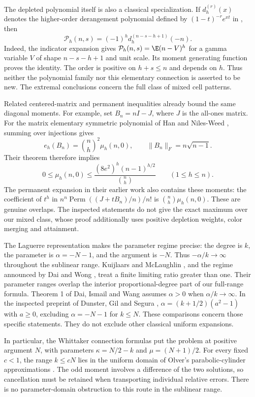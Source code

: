 The depleted polynomial itself is also a classical specialization. If $d_h^{(r)}(x)$ denotes the higher-order derangement polynomial defined by $(1-t)^{-r}e^{xt}$ in \cite[equation (2.22)]{KKJK}, then
\[
\mathcal P_h(n,s)=(-1)^h d_h^{(n-s-h+1)}(-n).
\]
Indeed, the indicator expansion gives $\mathcal P_h(n,s)=\E(n-V)^h$ for a gamma variable $V$ of shape $n-s-h+1$ and unit scale. Its moment generating function proves the identity. The order is positive on $h+s\le n$ and depends on $h$. Thus neither the polynomial family nor this elementary connection is asserted to be new. The extremal conclusions concern the full class of mixed cell patterns.

Related centered-matrix and permanent inequalities already bound the same diagonal moments. For example, set $B_n=nI-J$, where $J$ is the all-ones matrix. For the matrix elementary symmetric polynomial of Han and Niles-Weed \cite[equation (2), Theorem 1.2]{HNcentered}, summing over injections gives
\[
e_h(B_n)=\binom nh^2\mu_h(n,0),\qquad
\|B_n\|_F=n\sqrt{n-1}.
\]
Their theorem therefore implies
\[
0\le\mu_h(n,0)\le
\frac{(8e^2)^h(n-1)^{h/2}}{\binom nh}\qquad(1\le h\le n).
\]
The permanent expansion in their earlier work \cite[equation (29), Lemma 5.5 in the inspected preprint]{HNmixtures} also contains these moments: the coefficient of $t^h$ in
$n^n\operatorname{Perm}((J+tB_n)/n)/n!$ is $\binom nh\mu_h(n,0)$.
These are genuine overlaps. The inspected statements do not give the exact maximum over our mixed class, whose proof additionally uses positive depletion weights, color merging and attainment.

The Laguerre representation makes the parameter regime precise: the degree is $k$, the parameter is $\alpha=-N-1$, and the argument is $-N$. Thus $-\alpha/k\to\infty$ throughout the sublinear range. Kuijlaars and McLaughlin \cite[Theorem 7.1 and Remark 5.4]{KM}, and the regime announced by Dai and Wong \cite{DW}, treat a finite limiting ratio greater than one. Their parameter ranges overlap the interior proportional-degree part of our full-range formula. Theorem 1 of Dai, Ismail and Wang \cite{DIW} assumes $\alpha>0$ when $\alpha/k\to\infty$. In the inspected preprint of Dunster, Gil and Segura \cite[Section 1, equation (1.6) and Cases 1a, 1b and 2]{DGS}, $\alpha=(k+1/2)(a^2-1)$ with $a\ge0$, excluding $\alpha=-N-1$ for $k\le N$. These comparisons concern those specific statements. They do not exclude other classical uniform expansions.

In particular, the Whittaker connection formulas put the problem at positive argument $N$, with parameters $\kappa=N/2-k$ and $\mu=(N+1)/2$. For every fixed $c<1$, the range $k\le cN$ lies in the uniform domain of Olver's parabolic-cylinder approximations \cite{Olver,DLMFWhittaker}. The odd moment involves a difference of the two solutions, so cancellation must be retained when transporting individual relative errors. There is no parameter-domain obstruction to this route in the sublinear range.

